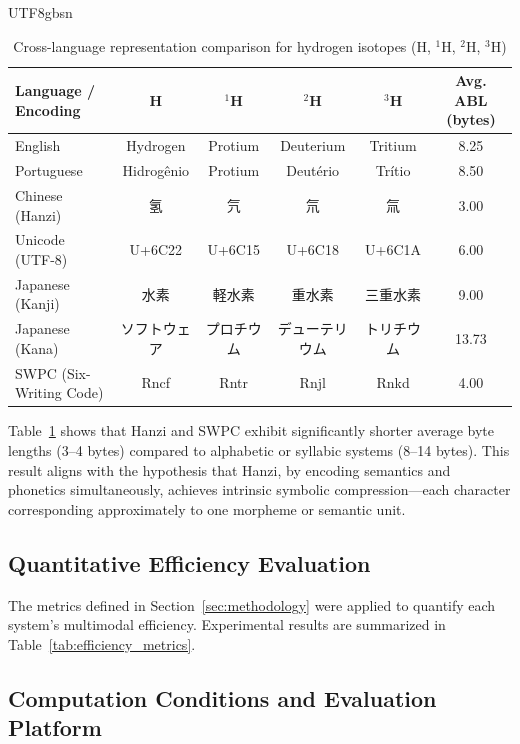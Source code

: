 \documentclass[conference]{IEEEtran}
\begin{document}
\begin{CJK*}{UTF8}{gbsn}
\begin{table}[htbp]
\centering
\caption{Cross-language representation comparison for hydrogen isotopes (H, $^{1}$H, $^{2}$H, $^{3}$H)}
\label{tab:isotope_comparison}
\footnotesize
\renewcommand{\arraystretch}{1.2}
\begin{tabular}{|l|c|c|c|c|c|}
\hline
\toprule
\textbf{Language / Encoding} & \textbf{H} & \textbf{$^{1}$H} & \textbf{$^{2}$H} & \textbf{$^{3}$H} & \textbf{Avg. ABL (bytes)} \\
\midrule
\hline
English & Hydrogen & Protium & Deuterium & Tritium & 8.25 \\
\hline
Portuguese & Hidrogênio & Protium & Deutério & Trítio & 8.50 \\
\hline
Chinese (Hanzi) & 氢 & 氕 & 氘 & 氚 & 3.00 \\
\hline
Unicode (UTF-8) & U+6C22 & U+6C15 & U+6C18 & U+6C1A & 6.00 \\
\hline
Japanese (Kanji) & 水素 & 軽水素 & 重水素 & 三重水素 & 9.00 \\
\hline
Japanese (Kana) & ソフトウェア & プロチウム & デューテリウム & トリチウム & 13.73 \\
\hline
SWPC (Six-Writing Code) & Rncf & Rntr & Rnjl & Rnkd & 4.00 \\
\bottomrule
\hline
\end{tabular}
\end{table}



Table~\ref{tab:isotope_comparison} shows that Hanzi and SWPC exhibit significantly shorter average byte lengths (3–4 bytes) compared to alphabetic or syllabic systems (8–14 bytes).  
This result aligns with the hypothesis that Hanzi, by encoding semantics and phonetics simultaneously, achieves intrinsic symbolic compression—each character corresponding approximately to one morpheme or semantic unit.

\subsection{Quantitative Efficiency Evaluation}

The metrics defined in Section~\ref{sec:methodology} were applied to quantify each system’s multimodal efficiency.  
Experimental results are summarized in Table~\ref{tab:efficiency_metrics}.

\subsection{Computation Conditions and Evaluation Platform}


\end{CJK*}
\end{document}
